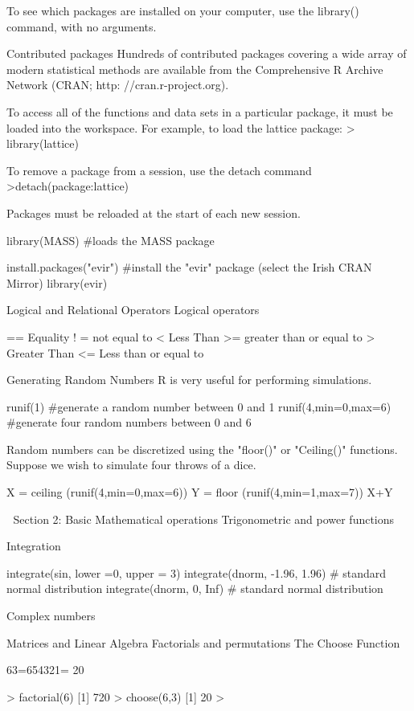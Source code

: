 \begin{frame}
\begin{frame}
To see which packages are installed on your computer, use the library() command, with no arguments.

Contributed packages
Hundreds of contributed packages covering a wide array of modern statistical methods are available from the Comprehensive R Archive Network (CRAN; http: //cran.r-project.org).

To access all of the functions and data sets in a particular package, it must be loaded into the workspace. 
For example, to load the lattice package:
> library(lattice)

To remove a package from a session, use the detach command
>detach(package:lattice)

Packages must be reloaded at the start of each new session.


library(MASS)							  #loads the MASS package

install.packages("evir")			#install the "evir" package (select the Irish CRAN Mirror)
library(evir)

Logical and Relational Operators
Logical operators

 ==
Equality
 ! = 
 not equal to
 < 
Less Than
 >=
 greater than or equal to
>
Greater Than
 <=
 Less than or equal to
 


Generating Random Numbers
R is very useful for performing simulations.


runif(1)										 #generate a random number between 0 and 1
runif(4,min=0,max=6) 			  #generate four random numbers between 0 and 6

Random numbers can be discretized using the "floor()" or "Ceiling()" functions. Suppose we wish to simulate four throws of a dice.

X = ceiling (runif(4,min=0,max=6))
Y = floor (runif(4,min=1,max=7))
X+Y


Section 2: Basic Mathematical operations
Trigonometric and power functions

Integration

integrate(sin, lower =0, upper = 3)
integrate(dnorm, -1.96, 1.96)					 # standard normal distribution
integrate(dnorm, 0, Inf)							   # standard normal distribution

Complex numbers 

Matrices and Linear Algebra
Factorials and permutations
The Choose Function

63=654321= 20



> factorial(6)
[1] 720
> choose(6,3)
[1] 20
> 





\end{frame}
\end{frame}
